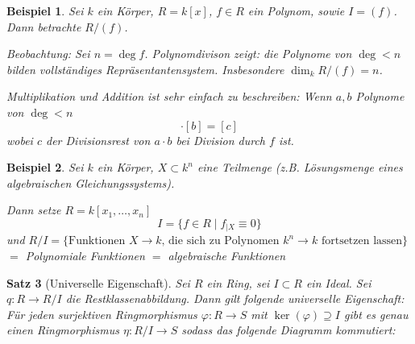 \documentclass[a4paper,12pt,numbers=noenddot,parskip=full]{scrartcl}
\theoremstyle{dotless}
\newtheorem{theorem}{Satz}[section]
\newtheorem{example}[theorem]{Beispiel}
\theoremstyle{remark}
\begin{document}
	\begin{example}
		Sei $k$ ein Körper, $R = k[x]$, $f \in R$ ein Polynom, sowie $I = (f)$. Dann betrachte $R/(f)$.
		
		Beobachtung: Sei $n = \deg f$. Polynomdivison zeigt: die Polynome von $\deg < n$ bilden vollständiges Repräsentantensystem. Insbesondere $\dim_k R/(f) = n$.
		
		Multiplikation und Addition ist sehr einfach zu beschreiben: Wenn $a,b$ Polynome von $\deg < n$
		\begin{equation*}
			[a] \cdot [b] = [c]
		\end{equation*}
		wobei $c$ der Divisionsrest von $a \cdot b$ bei Division durch $f$ ist.
	\end{example}

	\begin{example}
		Sei $k$ ein Körper, $X \subset k^n$ eine Teilmenge (z.B. Lösungsmenge eines algebraischen Gleichungssystems).
		
		Dann setze $R = k[x_1, \dots, x_n]$
		\begin{equation*}
			I = \{ f \in R \mid f_{\mid X} \equiv 0 \}
		\end{equation*}
		und $R/I = \{ \text{Funktionen $X \to k$, die sich zu Polynomen $k^n \to k$ fortsetzen lassen} \}$ $=$ Polynomiale Funktionen $=$ algebraische Funktionen
	\end{example}

	\begin{theorem}[Universelle Eigenschaft]
		Sei $R$ ein Ring, sei $I \subset R$ ein Ideal. Sei $q: R \to R/I$ die Restklassenabbildung. Dann gilt folgende universelle Eigenschaft: Für jeden surjektiven Ringmorphismus $\varphi: R \to S$ mit $\ker(\varphi) \supseteq I$ gibt es genau einen Ringmorphismus $\eta: R/I \to S$ sodass das folgende Diagramm kommutiert:
		
		\begin{center}
		\end{center}
	\end{theorem}
\end{document}
